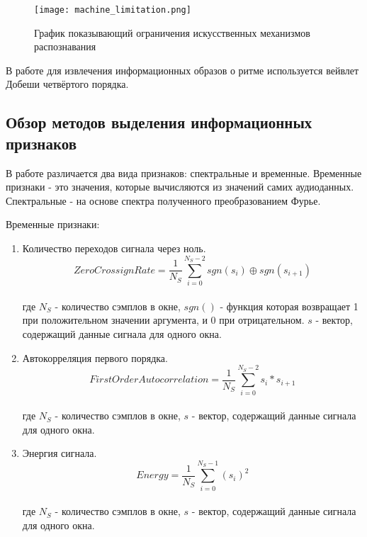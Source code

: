 \begin{figure}[ht]
\centering
  \texttt{[image: machine\_limitation.png]}
  \caption{График показывающий ограничения искусственных механизмов распознавания}
  \label{fig:domain:machine_limitation}
\end{figure}

В работе для извлечения информационных образов о ритме используется вейвлет Добеши четвёртого порядка. 

\subsection{Обзор методов выделения информационных признаков}
\label{sub:domain:feature_extraction}
В работе различается два вида признаков: спектральные и временные. Временные признаки - это значения, которые вычисляются из значений самих аудиоданных. Спектральные -  на основе спектра полученного преобразованием Фурье. 

Временные признаки:
\begin{enumerate}[label=\arabic*.]
\item Количество переходов сигнала через ноль.
\begin{equation}\label{eq:zcr}
ZeroCrossignRate =  \frac{1}{N_S} \sum \limits_{i=0}^{N_S - 2} sgn(s_i)  \oplus sgn(s_{i+1})
\end{equation}  
 \\ где $ N_S $ - количество сэмплов в окне, $ sgn() $ - функция которая возвращает 1  при положительном значении аргумента, и 0 при отрицательном.  $ s $ - вектор, содержащий данные сигнала для одного окна. \\	
\item Автокорреляция первого порядка.
\begin{equation}\label{eq:autocorrelation}
FirstOrderAutocorrelation =  \frac{1}{N_S} \sum \limits_{i=0}^{N_S - 2} s_i  * s_{i+1}
\end{equation}   \\
где $ N_S $ - количество сэмплов в окне,  $ s $ - вектор, содержащий данные сигнала для одного окна. \\	
\item Энергия сигнала.
\begin{equation}\label{eq:energy}
Energy =  \frac{1}{N_S} \sum \limits_{i=0}^{N_S - 1} ( s_i )^2
\end{equation}  \\
где $ N_S $ - количество сэмплов в окне,  $ s $ - вектор, содержащий данные сигнала для одного окна.	
\end{enumerate}


